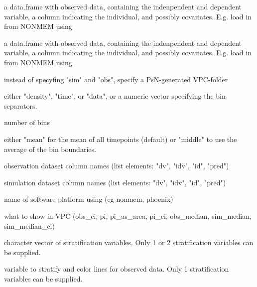 \documentclass[letterpaper]{book}
\begin{document}
\begin{Arguments}
\begin{ldescription}
\item[\code{sim}] a data.frame with observed data, containing the indenpendent and dependent variable, a column indicating the individual, and possibly covariates. E.g. load in from NONMEM using 

\item[\code{obs}] a data.frame with observed data, containing the indenpendent and dependent variable, a column indicating the individual, and possibly covariates. E.g. load in from NONMEM using 

\item[\code{psn\_folder}] instead of specyfing "sim" and "obs", specify a PsN-generated VPC-folder

\item[\code{bins}] either "density", "time", or "data", or a numeric vector specifying the bin separators.

\item[\code{n\_bins}] number of bins

\item[\code{bin\_mid}] either "mean" for the mean of all timepoints (default) or "middle" to use the average of the bin boundaries.

\item[\code{obs\_cols}] observation dataset column names (list elements: "dv", "idv", "id", "pred")

\item[\code{sim\_cols}] simulation dataset column names (list elements: "dv", "idv", "id", "pred")

\item[\code{software}] name of software platform using (eg nonmem, phoenix)

\item[\code{show}] what to show in VPC (obs\_ci, pi, pi\_as\_area, pi\_ci, obs\_median, sim\_median, sim\_median\_ci)

\item[\code{stratify}] character vector of stratification variables. Only 1 or 2 stratification variables can be supplied.

\item[\code{stratify\_color}] variable to stratify and color lines for observed data. Only 1 stratification variables can be supplied.


\end{ldescription}
\end{Arguments}
\end{document}
